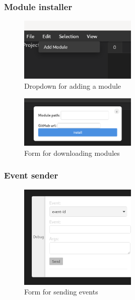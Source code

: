 \begin{frame}
  \frametitle{Module installer}
  \begin{figure}
    \centering
    \includegraphics[width=0.5\textwidth]{./pics/module-installer-tab.png}
    \caption{
      Dropdown for adding a module
    }
  \end{figure}
  \begin{figure}
    \centering
    \includegraphics[width=0.5\textwidth]{./pics/module-installer.png}
    \caption{
      Form for downloading modules
    }
  \end{figure}
\end{frame}

\begin{frame}
  \frametitle{Event sender}
  \begin{figure}
    \centering
    \includegraphics[width=0.5\textwidth]{./pics/event-mocking.png}
    \caption{
      Form for sending events
    }
  \end{figure}
\end{frame}

